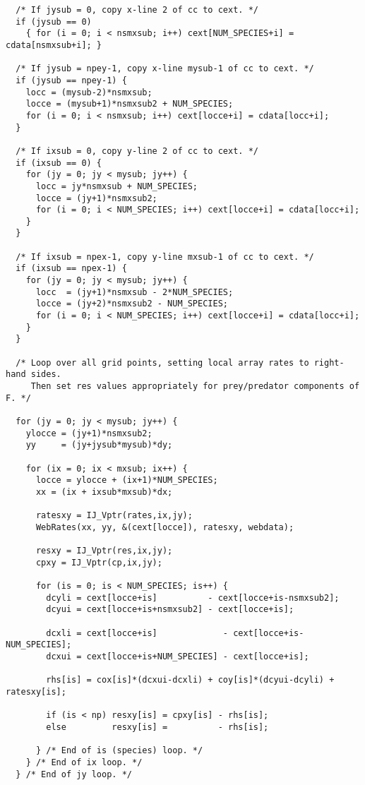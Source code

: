 \begin{verbatim}
  /* If jysub = 0, copy x-line 2 of cc to cext. */
  if (jysub == 0)
    { for (i = 0; i < nsmxsub; i++) cext[NUM_SPECIES+i] = cdata[nsmxsub+i]; }

  /* If jysub = npey-1, copy x-line mysub-1 of cc to cext. */
  if (jysub == npey-1) {
    locc = (mysub-2)*nsmxsub;
    locce = (mysub+1)*nsmxsub2 + NUM_SPECIES;
    for (i = 0; i < nsmxsub; i++) cext[locce+i] = cdata[locc+i];
  }

  /* If ixsub = 0, copy y-line 2 of cc to cext. */
  if (ixsub == 0) {
    for (jy = 0; jy < mysub; jy++) {
      locc = jy*nsmxsub + NUM_SPECIES;
      locce = (jy+1)*nsmxsub2;
      for (i = 0; i < NUM_SPECIES; i++) cext[locce+i] = cdata[locc+i];
    }
  }

  /* If ixsub = npex-1, copy y-line mxsub-1 of cc to cext. */
  if (ixsub == npex-1) {
    for (jy = 0; jy < mysub; jy++) {
      locc  = (jy+1)*nsmxsub - 2*NUM_SPECIES;
      locce = (jy+2)*nsmxsub2 - NUM_SPECIES;
      for (i = 0; i < NUM_SPECIES; i++) cext[locce+i] = cdata[locc+i];
    }
  }

  /* Loop over all grid points, setting local array rates to right-hand sides.
     Then set res values appropriately for prey/predator components of F. */

  for (jy = 0; jy < mysub; jy++) {
    ylocce = (jy+1)*nsmxsub2;
    yy     = (jy+jysub*mysub)*dy;

    for (ix = 0; ix < mxsub; ix++) {
      locce = ylocce + (ix+1)*NUM_SPECIES;
      xx = (ix + ixsub*mxsub)*dx;

      ratesxy = IJ_Vptr(rates,ix,jy);
      WebRates(xx, yy, &(cext[locce]), ratesxy, webdata);

      resxy = IJ_Vptr(res,ix,jy); 
      cpxy = IJ_Vptr(cp,ix,jy); 

      for (is = 0; is < NUM_SPECIES; is++) {
        dcyli = cext[locce+is]          - cext[locce+is-nsmxsub2];
        dcyui = cext[locce+is+nsmxsub2] - cext[locce+is];

        dcxli = cext[locce+is]             - cext[locce+is-NUM_SPECIES];
        dcxui = cext[locce+is+NUM_SPECIES] - cext[locce+is];

        rhs[is] = cox[is]*(dcxui-dcxli) + coy[is]*(dcyui-dcyli) + ratesxy[is];

        if (is < np) resxy[is] = cpxy[is] - rhs[is];
        else         resxy[is] =          - rhs[is];

      } /* End of is (species) loop. */
    } /* End of ix loop. */
  } /* End of jy loop. */


\end{verbatim}
